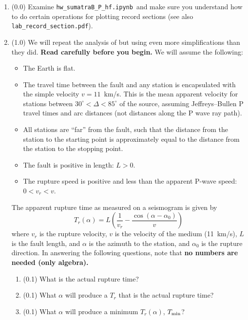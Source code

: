 \documentclass[11pt,titlepage,fleqn]{article}
\newcommand{\tfilehf}{{\tt hw\_sumatraB\_P\_hf.ipynb}}
\begin{document}
\begin{enumerate}
\item (0.0) Examine \tfilehf\ and make sure you understand how to do certain operations for plotting record sections (see also \verb+lab_record_section.pdf+).

\item (1.0) We will repeat the analysis of \citet{Ni2005} but using even more simplifications than they did. {\bf Read \citet{Ni2005} carefully before you begin.} We will assume the following:
%
\begin{itemize}
\item The Earth is flat.
\item The travel time between the fault and any station is encapsulated with the simple velocity $v = 11$~km/s. This is the mean apparent velocity for stations between $30^\circ < \Delta < 85^\circ$ of the source, assuming Jeffreys--Bullen P travel times and arc distances (not distances along the P wave ray path).
\item All stations are ``far'' from the fault, such that the distance from the station to the starting point is approximately equal to the distance from the station to the stopping point.
\item The fault is positive in length: $L > 0$.
\item The rupture speed is positive and less than the apparent P-wave speed: $0 < v_r < v$.
\end{itemize}
%
The apparent rupture time as measured on a seismogram is given by \citep[][Section 4.3.2]{SteinWysession}
%
\begin{equation}
T_r(\alpha) = L\left(\frac{1}{v_r} - \frac{\cos(\alpha-\alpha_0)}{v}\right)
\label{Tr}
\end{equation}
%
where $v_r$ is the rupture velocity, $v$ is the velocity of the medium (11~km/s), $L$ is the fault length, and $\alpha$ is the azimuth to the station, and $\alpha_0$ is the rupture direction. In answering the following questions, note that {\bf no numbers are needed (only algebra).}
%
\begin{enumerate}
\item (0.1) What is the actual rupture time?
\item (0.1) What $\alpha$ will produce a $T_r$ that is the actual rupture time?
\item (0.1) What $\alpha$ will produce a minimum $T_r(\alpha)$, $T_{\rm min}$?

\end{enumerate}
\end{enumerate}
\end{document}

